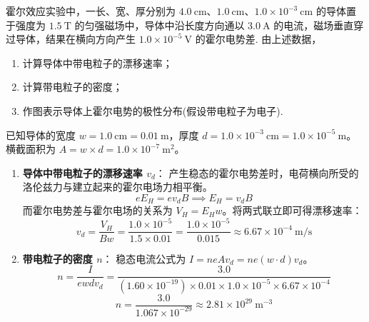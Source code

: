 \begin{exercise}\label{ex:17.12}
霍尔效应实验中，一长、宽、厚分别为 $4.0 \ \mathrm{cm}$、$1.0 \ \mathrm{cm}$、$1.0 \times 10^{-3} \ \mathrm{cm}$ 的导体置于强度为 $1.5 \ \mathrm{T}$ 的匀强磁场中，导体中沿长度方向通以 $3.0 \ \mathrm{A}$ 的电流，磁场垂直穿过导体，结果在横向方向产生 $1.0 \times 10^{-5} \ \mathrm{V}$ 的霍尔电势差. 由上述数据，
\begin{enumerate}
  \item[(a)] 计算导体中带电粒子的漂移速率；
  \item[(b)] 计算带电粒子的密度；
  \item[(c)] 作图表示导体上霍尔电势的极性分布(假设带电粒子为电子).
\end{enumerate}
\end{exercise}
\begin{solution}
已知导体的宽度 $w = 1.0 \ \mathrm{cm} = 0.01 \ \mathrm{m}$，厚度 $d = 1.0 \times 10^{-3} \ \mathrm{cm} = 1.0 \times 10^{-5} \ \mathrm{m}$。横截面积为 $A = w \times d = 1.0 \times 10^{-7} \ \mathrm{m^2}$。
\begin{enumerate}
    \item[(a)] \textbf{导体中带电粒子的漂移速率 $v_d$}：
    产生稳态的霍尔电势差时，电荷横向所受的洛伦兹力与建立起来的霍尔电场力相平衡。
    $$ e E_H = e v_d B \implies E_H = v_d B $$
    而霍尔电势差与霍尔电场的关系为 $V_H = E_H w$。将两式联立即可得漂移速率：
    $$ v_d = \frac{V_H}{B w} = \frac{1.0 \times 10^{-5}}{1.5 \times 0.01} = \frac{1.0 \times 10^{-5}}{0.015} \approx 6.67 \times 10^{-4} \ \mathrm{m/s} $$

    \item[(b)] \textbf{带电粒子的密度 $n$}：
    稳态电流公式为 $I = n e A v_d = n e (w \cdot d) v_d$。
    $$ n = \frac{I}{e w d v_d} = \frac{3.0}{(1.60 \times 10^{-19}) \times 0.01 \times 1.0 \times 10^{-5} \times 6.67 \times 10^{-4}} $$
    $$ n = \frac{3.0}{1.067 \times 10^{-29}} \approx 2.81 \times 10^{29} \ \mathrm{m^{-3}} $$


\end{enumerate}
\end{solution}
